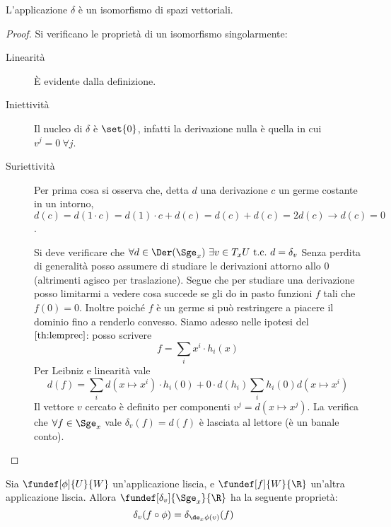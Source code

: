 \begin{lemma}
L'applicazione $\delta$ è un isomorfismo di spazi vettoriali.
\end{lemma}
\begin{proof}
Si verificano le proprietà di un isomorfismo singolarmente:
\begin{description}
\item[Linearità] È evidente dalla definizione.
\item[Iniettività] Il nucleo di $\delta$ è $\set{0}$, infatti la derivazione nulla è quella in cui $v^j = 0~ \forall j$.
\item[Suriettività] 
Per prima cosa si osserva che, detta $d$ una derivazione $c$ un germe costante in un intorno, $d(c)=d(1\cdot c)=d(1)\cdot c + d(c)=d(c) + d(c) = 2d(c) \rightarrow d(c) = 0$.

Si deve verificare che $\forall d\in \Der(\Sge_x)\ \exists v\in T_x U\ \text{t.c.}\ d = \delta_v$
Senza perdita di generalità posso assumere di studiare le derivazioni attorno allo $0$ (altrimenti agisco per traslazione).
Segue che per studiare una derivazione posso limitarmi a vedere cosa succede se gli do in pasto funzioni $f$ tali che $f(0)=0$.
Inoltre poiché $f$ è un germe si può restringere a piacere il dominio fino a renderlo convesso.
Siamo adesso nelle ipotesi del $\autoref{th:lemprec}$: posso scrivere
\begin{equation*} 
	f=\sum_i x^i\cdot h_i(x)
\end{equation*} 
Per Leibniz e linearità vale 
\begin{equation*}
	d(f)=\sum_i d(x\mapsto x^i)\cdot h_i(0)+ 0\cdot d(h_i) \sum_i h_i(0)d(x\mapsto x^i)
\end{equation*}
Il vettore $v$ cercato è definito per componenti $v^j=d(x\mapsto x^j)$. La verifica che $\forall f\in \Sge_x$ vale $\delta_v(f)=d(f)$ è lasciata al lettore (è un banale conto).

\qedhere
\end{description}
\end{proof}

\begin{oss}
Sia $\fundef[\phi]{U}{W}$ un'applicazione liscia, e $\fundef[f]{W}{\R}$ un'altra applicazione liscia. Allora $\fundef[\delta_v]{\Sge_x}{\R}$ ha la seguente proprietà:
\begin{equation*}
\delta_v(f\circ \phi) = \delta_{\de_x\phi (v)}(f)
\end{equation*}
\end{oss}

